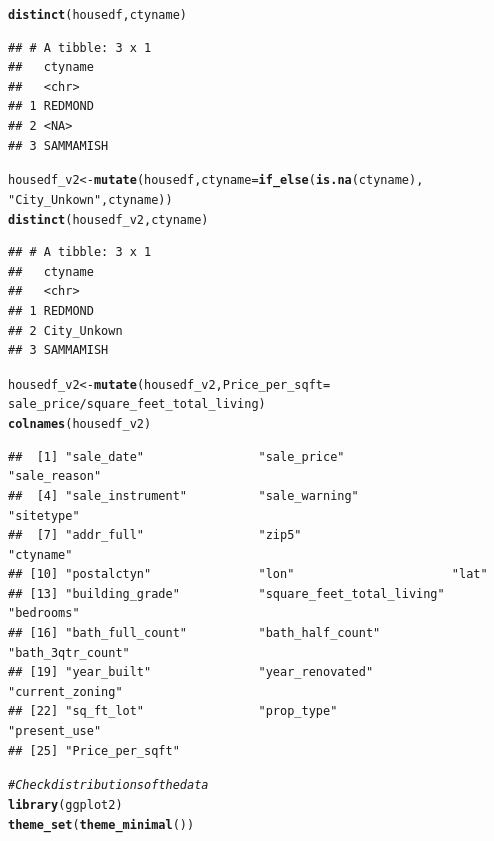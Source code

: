 \documentclass{article}\usepackage[]{graphicx}\usepackage[]{xcolor}
\makeatletter
\newcommand{\hlstr}[1]{\textcolor[rgb]{0.192,0.494,0.8}{#1}}%
\newcommand{\hlcom}[1]{\textcolor[rgb]{0.678,0.584,0.686}{\textit{#1}}}%
\newcommand{\hlopt}[1]{\textcolor[rgb]{0,0,0}{#1}}%
\newcommand{\hlstd}[1]{\textcolor[rgb]{0.345,0.345,0.345}{#1}}%
\newcommand{\hlkwb}[1]{\textcolor[rgb]{0.69,0.353,0.396}{#1}}%
\newcommand{\hlkwc}[1]{\textcolor[rgb]{0.333,0.667,0.333}{#1}}%
\newcommand{\hlkwd}[1]{\textcolor[rgb]{0.737,0.353,0.396}{\textbf{#1}}}%
\newenvironment{kframe}{%
 \def\at@end@of@kframe{}%
 \ifinner\ifhmode%
  \def\at@end@of@kframe{\end{minipage}}%
  \begin{minipage}{\columnwidth}%
 \fi\fi%
 \def\FrameCommand##1{\hskip\@totalleftmargin \hskip-\fboxsep
 \colorbox{shadecolor}{##1}\hskip-\fboxsep
     \hskip-\linewidth \hskip-\@totalleftmargin \hskip\columnwidth}%
 \MakeFramed {\advance\hsize-\width
   \@totalleftmargin\z@ \linewidth\hsize
   \@setminipage}}%
 {\par\unskip\endMakeFramed%
 \at@end@of@kframe}
\newenvironment{knitrout}{}{} %
\makeatother
\begin{document}
\begin{knitrout}
\begin{kframe}
\begin{alltt}
\hlkwd{distinct}\hlstd{(housedf,ctyname)}
\end{alltt}
\begin{verbatim}
## # A tibble: 3 x 1
##   ctyname  
##   <chr>    
## 1 REDMOND  
## 2 <NA>     
## 3 SAMMAMISH
\end{verbatim}
\begin{alltt}
\hlstd{housedf_v2} \hlkwb{<-}\hlkwd{mutate}\hlstd{(housedf,}\hlkwc{ctyname} \hlstd{=} \hlkwd{if_else}\hlstd{(}\hlkwd{is.na}\hlstd{(ctyname),}
                                              \hlstr{"City_Unkown"}\hlstd{,ctyname))}
\hlkwd{distinct}\hlstd{(housedf_v2,ctyname)}
\end{alltt}
\begin{verbatim}
## # A tibble: 3 x 1
##   ctyname    
##   <chr>      
## 1 REDMOND    
## 2 City_Unkown
## 3 SAMMAMISH
\end{verbatim}
\begin{alltt}
\hlstd{housedf_v2} \hlkwb{<-} \hlkwd{mutate}\hlstd{(housedf_v2,}\hlkwc{Price_per_sqft} \hlstd{=}
                       \hlstd{sale_price}\hlopt{/}\hlstd{square_feet_total_living)}
\hlkwd{colnames}\hlstd{(housedf_v2)}
\end{alltt}
\begin{verbatim}
##  [1] "sale_date"                "sale_price"               "sale_reason"             
##  [4] "sale_instrument"          "sale_warning"             "sitetype"                
##  [7] "addr_full"                "zip5"                     "ctyname"                 
## [10] "postalctyn"               "lon"                      "lat"                     
## [13] "building_grade"           "square_feet_total_living" "bedrooms"                
## [16] "bath_full_count"          "bath_half_count"          "bath_3qtr_count"         
## [19] "year_built"               "year_renovated"           "current_zoning"          
## [22] "sq_ft_lot"                "prop_type"                "present_use"             
## [25] "Price_per_sqft"
\end{verbatim}
\begin{alltt}
\hlcom{# Check distributions of the data}
\hlkwd{library}\hlstd{(ggplot2)}
\hlkwd{theme_set}\hlstd{(}\hlkwd{theme_minimal}\hlstd{())}


\end{alltt}
\end{kframe}
\end{knitrout}
\end{document}
